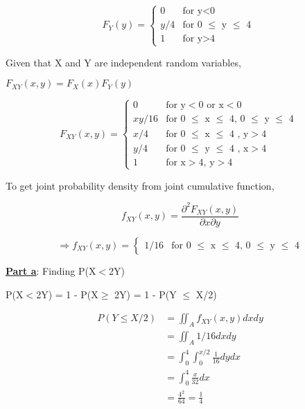 \documentclass{article}
\begin{document}
\begin{equation}
  F_Y(y) =
    \begin{cases}
      0 & \text{for y$<$0}\\
      y/4 & \text{for 0 $\leq$ y $\leq$ 4 }\\
      1 & \text{for y$>$4}
    \end{cases}       
\end{equation}

Given that X and Y are independent random variables, 

$F_{XY}(x,y) = F_X(x) F_Y(y)$

\begin{equation}
  F_{XY}(x,y) =
    \begin{cases}
      0 & \text{for y$<$0 or x$<$0}\\
      xy/16 & \text{for 0 $\leq$ x $\leq$ 4, 0 $\leq$ y $\leq$ 4 }\\
      x/4 & \text{for  0 $\leq$ x $\leq$ 4 , y$>$4}\\
      y/4 & \text{for  0 $\leq$ y $\leq$ 4 , x$>$4}\\
      1 & \text{for x$>$4, y$>$4}
    \end{cases}       
\end{equation}

To get joint probability density from joint cumulative function, 

\begin{equation}
    f_{XY}(x,y) = \frac{\partial^2 F_{XY}(x,y)}{\partial x \partial y}
\end{equation}

\begin{equation}
  \Rightarrow f_{XY}(x,y) =
    \begin{cases}
      1/16 & \text{for 0 $\leq$ x $\leq$ 4, 0 $\leq$ y $\leq$ 4}
    \end{cases}       
\end{equation}

\vspace{0.3cm}

\textbf{\underline{Part a}}: Finding P(X$<$2Y)

\vspace{0.2cm}

P(X$<$2Y) = 1 - P(X$\geq$ 2Y) = 1 - P(Y $\leq$ X/2)

\begin{equation} 
\begin{split}
P(Y \leq X/2) & = \iint_A f_{XY}(x,y) dx dy \\
 & = \iint_A 1/16 dx dy \\
 & = \int_{0}^{4} \int_{0}^{x/2} \frac{1}{16} dy dx \\
 & = \int_{0}^{4} \frac{x}{32} dx \\ 
 & = \frac{4^2}{64} = \frac{1}{4}
\end{split}
\end{equation}
\end{document}

